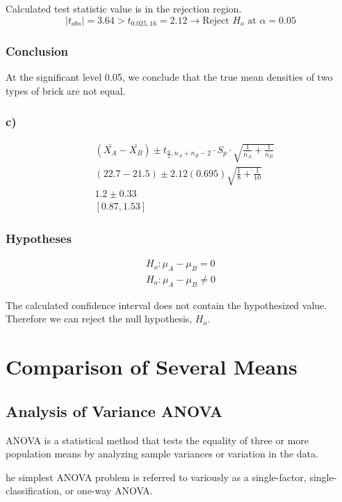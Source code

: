 \documentclass{article}
\begin{document}
       Calculated test statistic value is in the rejection region.
       \begin{equation*}
        |t_{obs}| = 3.64 > t_{0.025, 16} = 2.12 \rightarrow \text{Reject } H_{o} \text{ at } \alpha = 0.05
       \end{equation*}

       \subsubsection*{Conclusion}
       At the significant level 0.05, we conclude that 
       the true mean densities of two types of brick are not equal.

       \subsubsection*{c)}
            \begin{align*}
                &(\bar{X_{A}}- \bar{X_{B}}) \pm t_{\frac{\alpha}{2}, n_{A} + n_{B} - 2} \cdot S_{p} \cdot \sqrt{\frac{1}{n_{A}}+\frac{1}{n_{B}}}\\
                &(22.7 - 21.5) \pm 2.12 (0.695) \sqrt{\frac{1}{8}+\frac{1}{10}}\\
                &1.2 \pm 0.33\\
                &[0.87, 1.53]
            \end{align*}

        \subsubsection*{Hypotheses}
            \begin{align*}
                H_{o}: \mu_{A} - \mu_{B} = 0\\
                H_{a}: \mu_{A} - \mu_{B} \neq 0
            \end{align*}

            The calculated confidence interval does not contain the hypothesized value.
            Therefore we can reject the null hypothesis, $H_{o}$.

            \section*{Comparison of Several Means}
            \subsection*{Analysis of Variance ANOVA}
            ANOVA is a statistical method that tests the equality of three or more population 
            means by analyzing sample variances or variation in the data.\par
            he simplest ANOVA problem is referred to variously as a single-factor, single-classification, 
            or one-way ANOVA.
\end{document}
